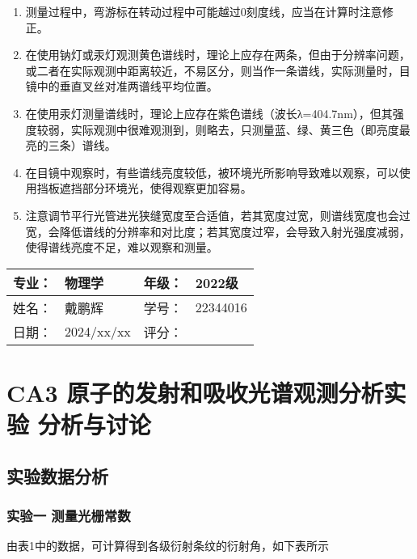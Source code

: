 \documentclass[dvipsnames, svgnames,a4paper,11pt]{article}
\begin{document}
\begin{enumerate}
	\item 	测量过程中，弯游标在转动过程中可能越过0刻度线，应当在计算时注意修正。
	
	\item 	在使用钠灯或汞灯观测黄色谱线时，理论上应存在两条，但由于分辨率问题，或二者在实际观测中距离较近，不易区分，则当作一条谱线，实际测量时，目镜中的垂直叉丝对准两谱线平均位置。
	
	\item 	在使用汞灯测量谱线时，理论上应存在紫色谱线（波长λ=404.7nm），但其强度较弱，实际观测中很难观测到，则略去，只测量蓝、绿、黄三色（即亮度最亮的三条）谱线。
	
	\item 	在目镜中观察时，有些谱线亮度较低，被环境光所影响导致难以观察，可以使用挡板遮挡部分环境光，使得观察更加容易。
	
	\item 	注意调节平行光管进光狭缝宽度至合适值，若其宽度过宽，则谱线宽度也会过宽，会降低谱线的分辨率和对比度；若其宽度过窄，会导致入射光强度减弱，使得谱线亮度不足，难以观察和测量。
	
\end{enumerate}
	

\clearpage
\begin{table}
	\renewcommand\arraystretch{1.7}
	\begin{tabularx}{\textwidth}{|X|X|X|X|}
	\hline
	专业：& 物理学 &年级：& 2022级\\
	\hline
	姓名： & 戴鹏辉 & 学号：& 22344016\\
	\hline
    日期：& 2024/xx/xx & 评分： &\\
	\hline
	\end{tabularx}
\end{table}

\section{CA3 \quad 原子的发射和吸收光谱观测分析实验 \quad\heiti 分析与讨论}

\subsection{实验数据分析}

	\subsubsection{实验一 测量光栅常数}
		由表1中的数据，可计算得到各级衍射条纹的衍射角，如下表所示
		
\end{document}
